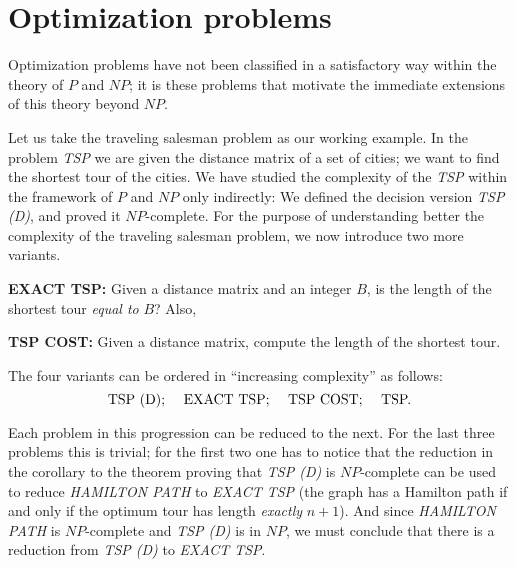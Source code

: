 \section{Optimization problems}
Optimization problems have not been classified in a satisfactory way within the theory of $P$ and $NP$; it is these problems that motivate the immediate extensions of this theory beyond $NP$.

Let us take the traveling salesman problem as our working example. In the problem \textit{TSP} we are given the distance matrix of a set of cities; we want to find the shortest tour of the cities. We have studied the complexity of the \textit{TSP} within the framework of $P$ and $NP$ only indirectly: We defined the decision version \textit{TSP (D)}, and proved it $NP$-complete. For the purpose of understanding better the complexity of the traveling salesman problem, we now introduce two more variants.

\textbf{EXACT TSP:} Given a distance matrix and an integer $B$, is the length of the shortest tour \textit{equal to} $B$? Also,  

\textbf{TSP COST:} Given a distance matrix, compute the length of the shortest tour.

The four variants can be ordered in ``increasing complexity'' as follows:
\[
\text{TSP (D); \quad EXACT TSP; \quad TSP COST; \quad TSP.}
\]

Each problem in this progression can be reduced to the next. For the last three problems this is trivial; for the first two one has to notice that the reduction in the corollary to the theorem proving that \textit{TSP (D)} is $NP$-complete can be used to reduce \textit{HAMILTON PATH} to \textit{EXACT TSP} (the graph has a Hamilton path if and only if the optimum tour has length \textit{exactly} $n + 1$). And since \textit{HAMILTON PATH} is $NP$-complete and \textit{TSP (D)} is in $NP$, we must conclude that there is a reduction from \textit{TSP (D)} to \textit{EXACT TSP}.

